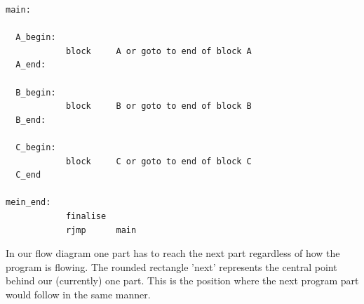 \begin{lstlisting}
main:

  A_begin:
            block     A or goto to end of block A
  A_end:

  B_begin:
            block     B or goto to end of block B
  B_end:

  C_begin:
            block     C or goto to end of block C
  C_end

mein_end:
            finalise
            rjmp      main
\end{lstlisting}

In our flow diagram one part has to reach the next part regardless of how the program is flowing. The rounded rectangle 'next' represents the central point behind our (currently) one part. This is the position where the next program part would follow in the same manner.

